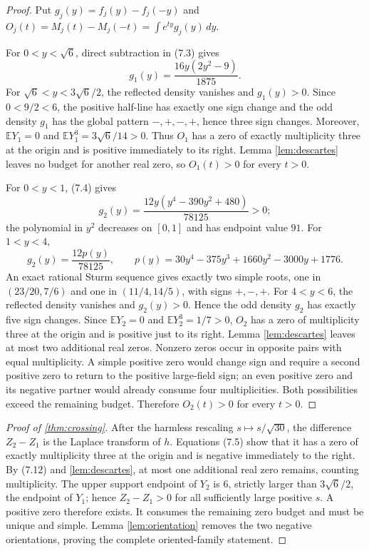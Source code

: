 \documentclass[11pt]{article}
\newcommand{\E}{\mathbb E}
\begin{document}
\begin{proof}
Put $g_j(y)=f_j(y)-f_j(-y)$ and
$O_j(t)=M_j(t)-M_j(-t)=\int e^{ty}g_j(y)\,dy$.

For $0<y<\sqrt6$, direct subtraction in (7.3) gives
\begin{equation*}
 g_1(y)=\frac{16y(2y^2-9)}{1875}.
\end{equation*}
For $\sqrt6<y<3\sqrt6/2$, the reflected density vanishes and $g_1(y)>0$.
Since $0<9/2<6$, the positive half-line has exactly one sign change and the
odd density $g_1$ has the global pattern $-,+,-,+$, hence three sign changes.
Moreover, $\E Y_1=0$ and $\E Y_1^3=3\sqrt6/14>0$.  Thus $O_1$ has a zero of
exactly multiplicity three at the origin and is positive immediately to its
right.  Lemma \ref{lem:descartes} leaves no budget for another real zero, so
$O_1(t)>0$ for every $t>0$.

For $0<y<1$, (7.4) gives
\begin{equation*}
 g_2(y)=\frac{12y(y^4-390y^2+480)}{78125}>0;
\end{equation*}
the polynomial in $y^2$ decreases on $[0,1]$ and has endpoint value $91$.
For $1<y<4$,
\begin{equation*}
 g_2(y)=\frac{12p(y)}{78125},\qquad
 p(y)=30y^4-375y^3+1660y^2-3000y+1776.
\end{equation*}
An exact rational Sturm sequence gives exactly two simple roots, one in
$(23/20,7/6)$ and one in $(11/4,14/5)$, with signs $+,-,+$.  For $4<y<6$,
the reflected density vanishes and $g_2(y)>0$.  Hence the odd density $g_2$
has exactly five sign changes.  Since $\E Y_2=0$ and $\E Y_2^3=1/7>0$,
$O_2$ has a zero of multiplicity three at the origin and is positive just to
its right.  Lemma \ref{lem:descartes} leaves at most two additional real
zeros.  Nonzero zeros occur in opposite pairs with equal multiplicity.  A
simple positive zero would change sign and require a second positive zero to
return to the positive large-field sign; an even positive zero and its
negative partner would already consume four multiplicities.  Both
possibilities exceed the remaining budget.  Therefore $O_2(t)>0$ for every
$t>0$.
\end{proof}

\begin{proof}[Proof of \cref{thm:crossing}]
After the harmless rescaling $s\mapsto s/\sqrt{30}$, the difference
$Z_2-Z_1$ is the Laplace transform of $h$.  Equations (7.5) show that it has
a zero of exactly multiplicity three at the origin and is negative
immediately to the right.  By (7.12) and \cref{lem:descartes}, at most one
additional real zero remains, counting multiplicity.  The upper support
endpoint of $Y_2$ is $6$, strictly larger than $3\sqrt6/2$, the endpoint of
$Y_1$; hence $Z_2-Z_1>0$ for all sufficiently large positive $s$.  A positive
zero therefore exists.  It consumes the remaining zero budget and must be
unique and simple.  Lemma \ref{lem:orientation} removes the two negative
orientations, proving the complete oriented-family statement.
\end{proof}
\end{document}
